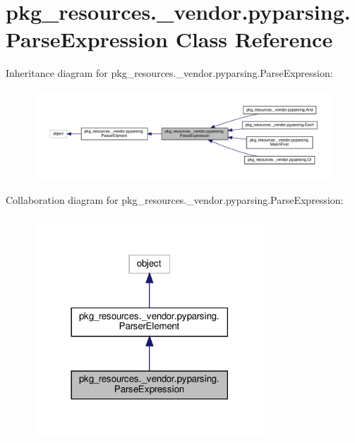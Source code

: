 \hypertarget{classpkg__resources_1_1__vendor_1_1pyparsing_1_1ParseExpression}{}\section{pkg\+\_\+resources.\+\_\+vendor.\+pyparsing.\+Parse\+Expression Class Reference}
\label{classpkg__resources_1_1__vendor_1_1pyparsing_1_1ParseExpression}


Inheritance diagram for pkg\+\_\+resources.\+\_\+vendor.\+pyparsing.\+Parse\+Expression\+:
\nopagebreak
\begin{figure}[H]
\begin{center}
\leavevmode
\includegraphics[width=350pt]{classpkg__resources_1_1__vendor_1_1pyparsing_1_1ParseExpression__inherit__graph}
\end{center}
\end{figure}


Collaboration diagram for pkg\+\_\+resources.\+\_\+vendor.\+pyparsing.\+Parse\+Expression\+:
\nopagebreak
\begin{figure}[H]
\begin{center}
\leavevmode
\includegraphics[width=246pt]{classpkg__resources_1_1__vendor_1_1pyparsing_1_1ParseExpression__coll__graph}
\end{center}
\end{figure}
